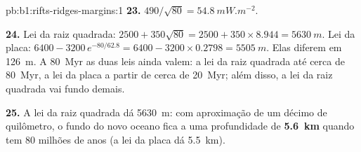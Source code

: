 \begin{solution}{pb:b1:rifts-ridges-margins:1}
\textbf{23.} $490/\sqrt{80} = \qty{54.8}{mW.m^{-2}}$.

\textbf{24.} Lei da raiz quadrada: $2500 + 350\sqrt{80} = 2500 + 350\times8.944 =
\qty{5630}{m}$. Lei da placa: $6400 - 3200\,e^{-80/62.8} = 6400 - 3200\times0.2798
= \qty{5505}{m}$. Elas diferem em \qty{126}{m}. A \qty{80}{Myr} as duas leis ainda
valem: a lei da raiz quadrada até cerca de \qty{80}{Myr}, a lei da placa a partir de cerca de
\qty{20}{Myr}; além disso, a lei da raiz quadrada vai fundo demais.

\textbf{25.} A lei da raiz quadrada dá \qty{5630}{m}: com aproximação de um décimo de
quilômetro, o fundo do novo oceano fica a uma profundidade de
\textbf{\qty[text-series-to-math=true]{5.6}{km}} quando tem 80 milhões de anos
(a lei da placa dá \qty{5.5}{km}).
\end{solution}
